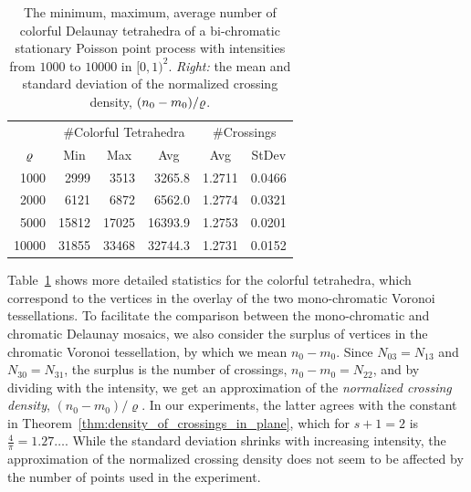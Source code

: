 \documentclass[a4paper]{article}
\newcommand {\mm}[1]   {\ifmmode{#1}\else{\mbox{\(#1\)}}\fi}
\newcommand{\intensity}     {\mm{\varrho}}
\theoremstyle{definition}
\numberwithin{theorem}{section}
\numberwithin{equation}{section}
\begin{document}
\begin{table}[hbt]
    \centering
    \begin{tabular}{r||rrr|rr}
                  & \multicolumn{3}{c|}{\#Colorful Tetrahedra}
                  & \multicolumn{2}{c}{\#Crossings} \\
      \multicolumn{1}{c||}{$\intensity$} & \multicolumn{1}{c}{Min} & \multicolumn{1}{c}{Max} & \multicolumn{1}{c|}{Avg} & \multicolumn{1}{c}{Avg} & \multicolumn{1}{c}{StDev} \\
      \hline \hline
      1000  &  2999  &  3513  & 3265.8  & 1.2711  & 0.0466\\
      2000  &  6121  &  6872  & 6562.0  & 1.2774  & 0.0321\\
      5000  &  15812  &  17025  & 16393.9  & 1.2753  & 0.0201\\
      10000  &  31855  &  33468  & 32744.3  & 1.2731  & 0.0152
    \end{tabular}
    \caption{The minimum, maximum, average number of colorful Delaunay tetrahedra of a bi-chromatic stationary Poisson point process with intensities from $1000$ to $10000$ in $[0,1)^2$.
    \emph{Right:} the mean and standard deviation of the normalized crossing density, $(n_0 - m_0)/\intensity$.}
    \label{tbl:statistics_d2_s1}
\end{table}

\medskip
Table~\ref{tbl:statistics_d2_s1} shows more detailed statistics for the colorful tetrahedra, which correspond to the vertices in the overlay of the two mono-chromatic Voronoi tessellations.
To facilitate the comparison between the mono-chromatic and chromatic Delaunay mosaics, we also consider the surplus of vertices in the chromatic Voronoi tessellation, by which we mean $n_0 - m_0$.
Since $N_{03} = N_{13}$ and $N_{30} = N_{31}$, the surplus is the number of crossings, $n_0 - m_0 = N_{22}$, and by dividing with the intensity, we get an approximation of the \emph{normalized crossing density}, $(n_0 - m_0) / \varrho$.
In our experiments, the latter agrees with the constant in Theorem~\ref{thm:density_of_crossings_in_plane}, which for $s+1 = 2$ is $\frac{4}{\pi} = 1.27\ldots$.
While the standard deviation shrinks with increasing intensity, the approximation of the normalized crossing density does not seem to be affected by the number of points used in the experiment.
\end{document}
